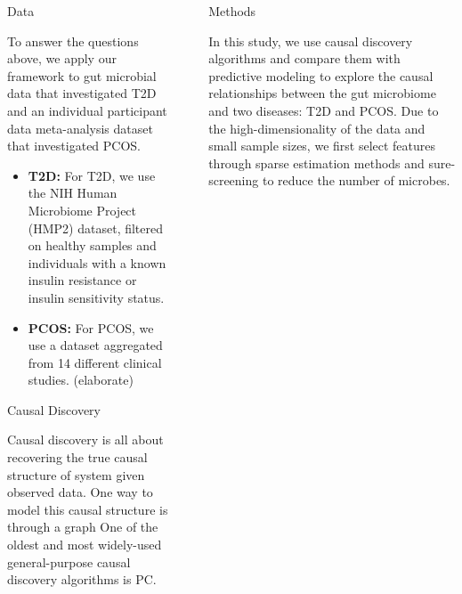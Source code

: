\documentclass[final]{beamer}
\newlength{\sepwidth}
\newlength{\colwidth}
\newcommand{\separatorcolumn}{\begin{column}{\sepwidth}\end{column}}
\begin{document}
\begin{frame}[t]
\begin{columns}[t]
\begin{column}{\colwidth}
  \begin{block}{Data}

    To answer the questions above, we apply our framework to gut microbial data that investigated T2D and 
    an individual participant data meta-analysis dataset that investigated PCOS. 
    
    \begin{itemize}
      \item \textbf{T2D:} For T2D, we use the NIH Human Microbiome Project (HMP2) dataset, filtered on healthy samples and individuals with a known insulin resistance or insulin sensitivity status.
      \item \textbf{PCOS:} For PCOS, we use a dataset aggregated from 14 different clinical studies. (elaborate)
    \end{itemize}

  \end{block}
  
  \begin{alertblock}{Causal Discovery}
  
  	Causal discovery is all about recovering the true causal structure of system given observed data. One way to model this causal structure is through a graph One of the oldest and most widely-used general-purpose causal discovery algorithms
	is PC. 
  
  \end{alertblock}

\end{column}

\separatorcolumn

\begin{column}{\colwidth}

  \begin{block}{Methods}

   In this study, we use causal discovery algorithms and compare them with 
   predictive modeling to explore the causal relationships between the 
   gut microbiome and two diseases: T2D and PCOS. Due to the high-dimensionality
   of the data and small sample sizes, we first select features through sparse
   estimation methods and sure-screening to reduce the number of microbes. 


\end{block}
\end{column}
\end{columns}
\end{frame}
\end{document}
